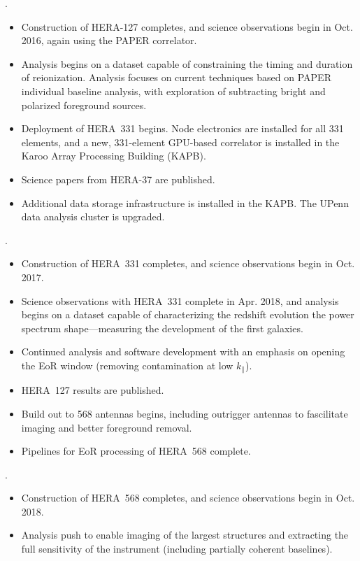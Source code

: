 \documentclass[preprint]{aastex}
\begin{document}
.
\begin{itemize}\setlength{\parskip}{0pt}
\vspace{-7pt}
  \item Construction of HERA-127 completes, and science observations begin in Oct. 2016, again using the PAPER correlator.
  \item Analysis begins on a dataset capable of constraining the timing and duration of reionization. Analysis focuses on current techniques based on PAPER individual baseline analysis, with exploration of subtracting bright and polarized foreground sources.
  \item Deployment of HERA~331 begins. Node electronics are installed for all 331 elements, and a new, 331-element GPU-based correlator is installed in the Karoo Array Processing Building (KAPB).
  \item Science papers from HERA-37 are published.
  \item  Additional data storage infrastructure is installed in the
KAPB.  The UPenn data analysis cluster is upgraded. 
\end{itemize}

.
\begin{itemize}
\setlength{\parskip}{0pt}
\vspace{-7pt}
  \item Construction of HERA~331 completes, and science observations begin in Oct. 2017.
  \item Science observations with HERA~331 complete in Apr. 2018, and analysis begins on a dataset capable of
characterizing the redshift evolution the power spectrum shape---measuring the development of the first galaxies.
  \item Continued analysis and software development with an emphasis on opening the EoR window (removing contamination at low $k_{\parallel}$). 
  \item  HERA~127 results are published.
  \item Build out to 568 antennas begins, including outrigger antennas to fascilitate imaging and better foreground removal.
  \item Pipelines for EoR processing of HERA~568 complete.
\end{itemize}

.
\begin{itemize}
\setlength{\parskip}{0pt}
\vspace{-7pt}
  \item Construction of HERA~568 completes, and science observations begin in Oct. 2018.
  \item Analysis push to enable imaging of the largest structures and extracting the full sensitivity of the instrument (including partially coherent baselines). 
\end{itemize}
\end{document}
